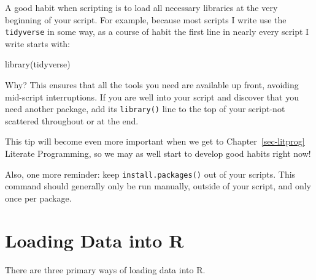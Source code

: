 \documentclass[
  letterpaper,
]{book}
\newenvironment{Shaded}{\begin{snugshade}}{\end{snugshade}}
\newcommand{\FunctionTok}[1]{\textcolor[rgb]{0.28,0.35,0.67}{#1}}
\newcommand{\NormalTok}[1]{\textcolor[rgb]{0.00,0.23,0.31}{#1}}
\begin{document}
\begin{tcolorbox}[enhanced jigsaw, colframe=quarto-callout-tip-color-frame, breakable, arc=.35mm, bottomtitle=1mm, bottomrule=.15mm, colbacktitle=quarto-callout-tip-color!10!white, rightrule=.15mm, colback=white, opacityback=0, opacitybacktitle=0.6, coltitle=black, left=2mm, toptitle=1mm, toprule=.15mm, titlerule=0mm, leftrule=.75mm, title=\textcolor{quarto-callout-tip-color}{\faLightbulb}\hspace{0.5em}{Tip from the Helpdesk: Library First Before You Go Go}]

A good habit when scripting is to load all necessary libraries at the
very beginning of your script. For example, because most scripts I write
use the \texttt{tidyverse} in some way, as a course of habit the first
line in nearly every script I write starts with:

\begin{Shaded}
\begin{Highlighting}[]
\FunctionTok{library}\NormalTok{(tidyverse)}
\end{Highlighting}
\end{Shaded}

Why? This ensures that all the tools you need are available up front,
avoiding mid-script interruptions. If you are well into your script and
discover that you need another package, add its \texttt{library()} line
to the top of your script-not scattered throughout or at the end.

This tip will become even more important when we get to
Chapter~\ref{sec-litprog} Literate Programming, so we may as well start
to develop good habits right now!

Also, one more reminder: keep \texttt{install.packages()} out of your
scripts. This command should generally only be run manually, outside of
your script, and only once per package.

\end{tcolorbox}

\section{Loading Data into R}\label{loading-data-into-r}

There are three primary ways of loading data into R.
\end{document}
